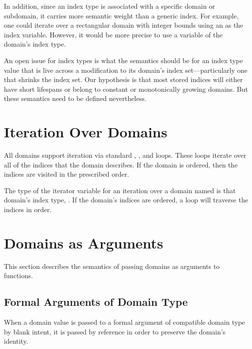 In addition, since an index type is associated with a specific domain or subdomain, it
carries more semantic weight than a generic index.  For example, one could
iterate over a rectangular domain with integer bounds using an  as
the index variable.  However, it would be more precise to use a variable of the
domain's index type.

\begin{openissue}

An open issue for index types is what the semantics should be for an
index type value that is live across a modification to its domain's
index set---particularly one that shrinks the index set.  Our
hypothesis is that most stored indices will either have short
lifespans or belong to constant or monotonically growing domains.  But
these semantics need to be defined nevertheless.

\end{openissue}

\section{Iteration Over Domains}
\label{Iteration_over_Domains}

All domains support iteration via standard , , and 
loops.  These loops iterate over all of the indices that the domain
describes.  If the domain is ordered, then the indices are visited in the
prescribed order.  

The type of the iterator variable for an iteration over a
domain named  is that domain's index type, .
If the domain's indices are ordered, a  loop will traverse the
indices in order.


\section{Domains as Arguments}
\label{Domain_Arguments}

This section describes the semantics of passing domains as arguments
to functions.

\subsection{Formal Arguments of Domain Type}

When a domain value is passed to a formal argument of compatible
domain type by blank intent, it is passed by reference in order to
preserve the domain's identity.

